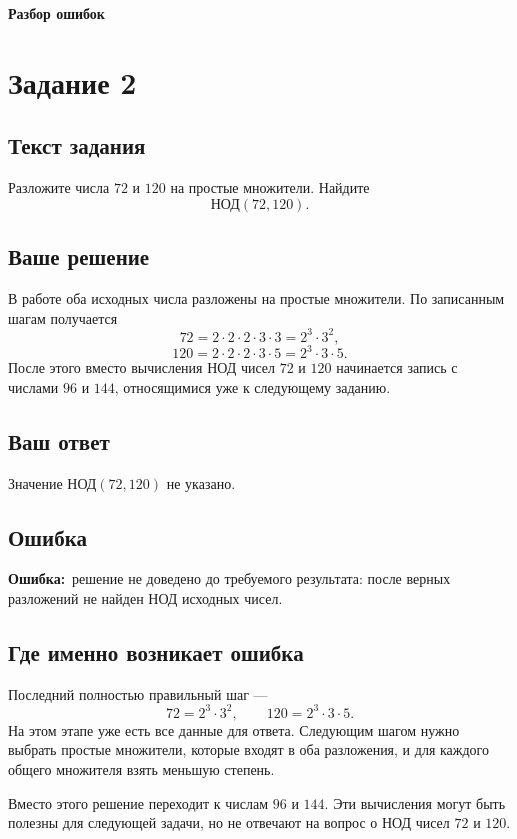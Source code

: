 \documentclass[a4paper,12pt]{article}
\newcommand{\ErrorLabel}{\textcolor{red!75!black}{\textbf{Ошибка:}}}
\begin{document}
\newpage
\thispagestyle{empty}
\vspace*{\fill}
\begin{center}
{\Huge\bfseries Разбор ошибок}
\end{center}
\vspace*{\fill}

\newpage
{}\label{task:2}
\section*{Задание 2}

\subsection*{Текст задания}
Разложите числа $72$ и $120$ на простые множители. Найдите
\[
\text{НОД}(72,120).
\]

\subsection*{Ваше решение}
В работе оба исходных числа разложены на простые множители. По записанным шагам получается
\[
72=2\cdot2\cdot2\cdot3\cdot3=2^3\cdot3^2,
\]
\[
120=2\cdot2\cdot2\cdot3\cdot5=2^3\cdot3\cdot5.
\]
После этого вместо вычисления НОД чисел $72$ и $120$ начинается запись с числами $96$ и $144$, относящимися уже к следующему заданию.

\subsection*{Ваш ответ}
Значение $\text{НОД}(72,120)$ не указано.

\subsection*{Ошибка}
\ErrorLabel\ решение не доведено до требуемого результата: после верных разложений не найден НОД исходных чисел.

\subsection*{Где именно возникает ошибка}
Последний полностью правильный шаг ---
\[
72=2^3\cdot3^2,
\qquad
120=2^3\cdot3\cdot5.
\]
На этом этапе уже есть все данные для ответа. Следующим шагом нужно выбрать простые множители, которые входят в оба разложения, и для каждого общего множителя взять меньшую степень.

Вместо этого решение переходит к числам $96$ и $144$. Эти вычисления могут быть полезны для следующей задачи, но не отвечают на вопрос о НОД чисел $72$ и $120$.
\end{document}
